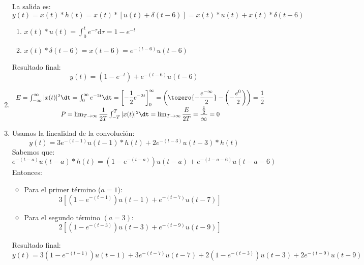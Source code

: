 \begin{enumerate}[label=\color{red}\textbf{\alph*)}]
        La salida es: \[
            y(t)=x(t)\ast h(t)=x(t)\ast [u(t)+\delta(t-6)]=x(t)\ast u(t)+x(t)\ast \delta(t-6)
        \] 
        \begin{enumerate}[label=\arabic*)]
            \item $x(t)\ast u(t)=\int_{0}^{t} e^{-\tau}\mathrm{d}\tau=1-e^{-t}$
            \item $x(t)\ast \delta(t-6)=x(t-6)=e^{-(t-6)}u(t-6) $
        \end{enumerate}
        Resultado final: \[
        y(t)=(1-e^{-t} )+e^{-(t-6)}u(t-6) 
        \] 
	\item {}

        \[
        \begin{array}{c}
           E=\int_{-\infty}^{\infty} |x(t)|^2\dt=\int_{0}^{\infty} e^{-2t}\dt=\left[ -\dfrac{1}{2}e^{-2t}  \right]_0^\infty=\left( \tozero{-\dfrac{e^{-\infty} }{2}} -\left( -\dfrac{e^{0} }{2} \right)  \right) =\dfrac{1}{2}\\
           P=\lim_{T \to \infty} \dfrac{1}{2T}\int_{-T}^{T}|x(t)|^2\dt=\lim_{T \to \infty} \dfrac{E}{2T}=\dfrac{\frac{1}{2} }{\infty}=0
        \end{array}
        \] 
	\item {}

        Usamos la linealidad de la convolución: \[
        y(t)=3e^{-(t-1)}u(t-1)\ast h(t)+2e^{-(t-3)}u(t-3)\ast h(t)  
        \] 
        Sabemos que: \[
        e^{-(t-a)}u(t-a)\ast h(t)=(1-e^{-(t-a)} )u(t-a)+e^{-(t-a-6)} u(t-a-6)
        \] 
        Entonces:
        \begin{itemize}[label=\textbullet]
            \item Para el primer término ($a=1$): \[
            3\left[ (1-e^{-(t-1)} )u(t-1)+e^{-(t-7)}u(t-7)  \right] 
            \] 
            \item Para el segundo término $(a=3)$:  \[
            2\left[ (1-e^{-(t-3)} )u(t-3)+e^{-(t-9)}u(t-9)  \right] 
            \] 
        \end{itemize}
        Resultado final: \[
        y(t)=3(1-e^{-(t-1)} )u(t-1)+3e^{-(t-7)} u(t-7)+2(1-e^{-(t-3)} )u(t-3)+2e^{-(t-9)}u(t-9) 
        \] 
\end{enumerate}

